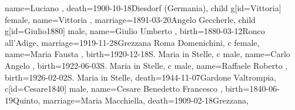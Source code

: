 \documentclass{article}
\begin{document}
\begin{midpage}
\begin{center}
\begin{genealogypicture}
{{{{{{{{{{{                                            name={Luciano },
                                            death={1900-10-18}{Diesdorf (Germania)},
                                        }
                                    }
                                    child{
                                        g[id=Vittoria]{
                                            female,
                                            name={Vittoria },
                                            marriage={1891-03-20}{Angelo Geccherle},
                                        }
                                    }
                                    child{
                                        g[id=Giulio1880]{
                                            male,
                                            name={Giulio Umberto },
                                            birth={1880-03-12}{Ronco all'Adige},
                                            marriage={1919-11-28}{Grezzana \newline Roma Domenichini},
                                        }
                                        c{
                                            female,
                                            name={Maria Fausta },
                                            birth={1920-12-18}{S. Maria in Stelle},
                                        }
                                        c{
                                            male,
                                            name={Carlo Angelo },
                                            birth={1922-06-03}{S. Maria in Stelle},
                                        }
                                        c{
                                            male,
                                            name={Raffaele Roberto },
                                            birth={1926-02-02}{S. Maria in Stelle},
                                            death={1944-11-07}{Gardone Valtrompia},
                                        }
                                    }
                                }
                                c[id=Cesare1840]{
                                    male,
                                    name={Cesare Benedetto Francesco },
                                    birth={1840-06-19}{Quinto},
                                    marriage={Maria Macchiella}{},
                                    death={1909-02-18}{Grezzana},
                                }
}}}}}}}}
\end{genealogypicture}
\end{center}
\end{midpage}
\end{document}
